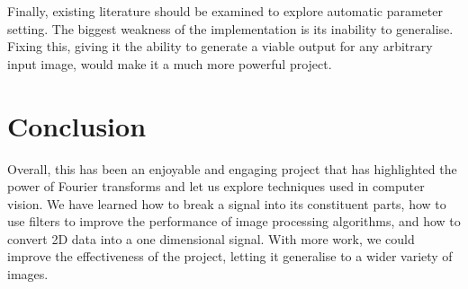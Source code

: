 \documentclass[conference]{IEEEtran}
\begin{document}
Finally, existing literature should be examined to explore automatic parameter setting. The biggest weakness of the implementation is its inability to generalise. Fixing this, giving it the ability to generate a viable output for any arbitrary input image, would make it a much more powerful project.

\section{Conclusion}

Overall, this has been an enjoyable and engaging project that has highlighted the power of Fourier transforms and let us explore techniques used in computer vision. We have learned how to break a signal into its constituent parts, how to use filters to improve the performance of image processing algorithms, and how to convert 2D data into a one dimensional signal. With more work, we could improve the effectiveness of the project, letting it generalise to a wider variety of images.
\end{document}
